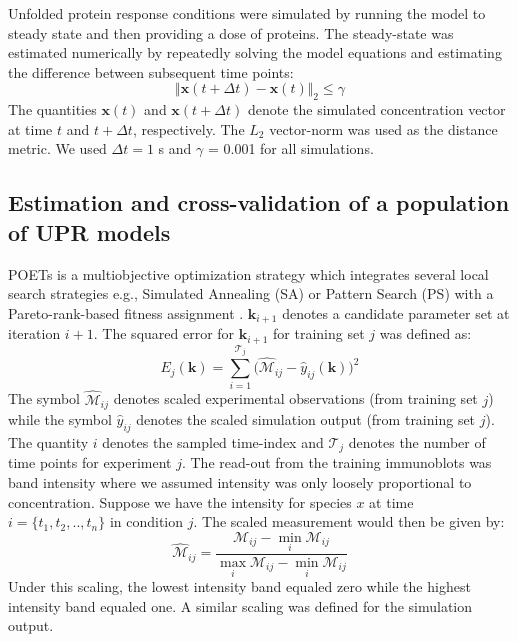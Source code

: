 \documentclass[fleqn,10pt]{wlscirep}
\begin{document}
Unfolded protein response conditions were simulated by running the model to steady state and then providing a dose of proteins.
The steady-state was estimated numerically by repeatedly solving the model equations and estimating the difference between subsequent time points:
\begin{equation}
\Vert\mathbf{x}\left(t+\Delta{t}\right) - \mathbf{x}\left(t\right)\Vert_{2}\leq\gamma
\end{equation}
The quantities $\mathbf{x}\left(t\right)$ and $\mathbf{x}\left(t+\Delta{t}\right)$ denote the simulated concentration vector at time $t$ and $t + \Delta{t}$, respectively.
The $L_{2}$ vector-norm was used as the distance metric.
We used $\Delta{t} = 1$ s and $\gamma$ = 0.001 for all simulations.

\subsection*{Estimation and cross-validation of a population of UPR models}
POETs is a multiobjective optimization strategy which integrates several local search strategies e.g., Simulated Annealing (SA) or Pattern Search (PS)
with a Pareto-rank-based fitness assignment \cite{Song:2010ij}.
$\mathbf{k}_{i+1}$ denotes a candidate parameter set at iteration $i+1$.
The squared error for $\mathbf{k}_{i+1}$ for training set $j$ was defined as:
\begin{equation}\label{eqn_cost2}
	E_{j}(\mathbf{k}) = \sum_{i=1}^{\mathcal{T}_{j}}\biggl(\hat{\mathcal{M}}_{ij}-\hat{y}_{ij}(\mathbf{k})\biggr)^2
\end{equation}
The symbol $\hat{\mathcal{M}}_{ij}$ denotes scaled experimental observations (from training set $j$) while the symbol $\hat{y}_{ij}$ denotes the scaled simulation output (from training set $j$).
The quantity $i$ denotes the sampled time-index and $\mathcal{T}_{j}$ denotes the number of time points for experiment $j$.
The read-out from the training immunoblots was band intensity where we assumed intensity was only loosely proportional to concentration.
Suppose we have the intensity for species $x$ at time $i=\{t_{1},t_{2},..,t_{n}\}$ in condition $j$. The scaled measurement would then be given by:
\begin{equation}\label{norm_exp_data}
\hat{\mathcal{M}}_{ij} = \frac{\mathcal{M}_{ij} - \min_{i}\mathcal{M}_{ij}}{\max_{i}{\mathcal{M}_{ij}}-\min_{i}{\mathcal{M}_{ij}}}
\end{equation}
Under this scaling, the lowest intensity band equaled zero while the highest intensity band equaled one.
A similar scaling was defined for the simulation output.
\end{document}
